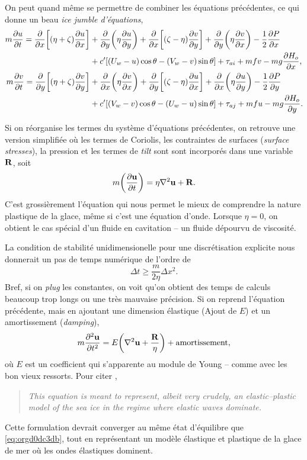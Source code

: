 \documentclass[10pt]{article}
\numberwithin{equation}{section}
\newcommand{\uu}{\vb{u}}
\begin{document}
On peut quand même se permettre de combiner les équations précédentes, ce qui donne un beau \emph{ice jumble d'équations},
\begin{align}
   m \pdv{u}{t} = \pdv{}{x}\qty[(\eta + \zeta)\pdv{u}{x}] &+\pdv{}{y}\qty(\eta\pdv{u}{y}) + \pdv{}{x}\qty[(\zeta-\eta)\pdv{v}{y}] + \pdv{}{y}\qty(\eta \pdv{v}{x}) - \frac{1}{2}\pdv{P}{x}\nonumber\\
     & + c'\qty[\qty(U_w-u)\cos\theta - \qty(V_w-v)\sin\theta] + \tau_{ai} + mfv - mg\pdv{H_o}{x},\\
   m \pdv{v}{t} = \pdv{}{y}\qty[(\eta + \zeta)\pdv{v}{y}] &+\pdv{}{x}\qty(\eta\pdv{v}{x}) + \pdv{}{y}\qty[(\zeta-\eta)\pdv{u}{x}] + \pdv{}{x}\qty(\eta \pdv{u}{y}) - \frac{1}{2}\pdv{P}{y}\nonumber\\
     & + c'\qty[\qty(V_w-v)\cos\theta - \qty(U_w-u)\sin\theta] + \tau_{aj} + mfu - mg\pdv{H_o}{y}.
\end{align}

Si on réorganise les termes du système d'équations précédentes, on retrouve une version simplifiée où les termes de Coriolis, les contraintes de surfaces (\emph{surface stresses}), la pression et les termes de \emph{tilt} sont sont incorporés dans une variable \(\vb{R}\), soit
\begin{equation}
\label{eq:orgd0dc3db}
   m\qty(\pdv{\uu}{t}) = \eta \laplacian{\uu} + \vb{R}.
\end{equation}
C'est grossièrement l'équation qui nous permet le mieux de comprendre la nature plastique de la glace, même si c'est une équation d'onde. 
Lorsque \(\eta=0\), on obtient le cas spécial d'un fluide en cavitation -- un fluide dépourvu de viscosité.\bigskip

La condition de stabilité unidimensionelle pour une discrétisation explicite nous donnerait un pas de temps numérique de l'ordre de
\begin{equation}
   \Delta t \geq \frac{m}{2\eta} \Delta x^2.
\end{equation}
Bref, si on \emph{plug} les constantes, on voit qu'on obtient des temps de calculs beaucoup trop longs ou une très mauvaise précision.
Si on reprend l'équation précédente, mais en ajoutant une dimension élastique (Ajout de \(E\)) et un amortissement (\emph{damping}),
\begin{equation}
\label{eq:orgbf8b0d0}
   m \pdv[2]{\uu}{t} =E \qty(\laplacian{\uu} + \frac{\vb{R}}{\eta}) + \text{amortissement},
\end{equation}
où \(E\) est un coefficient qui s'apparente au module de Young -- comme avec les bon vieux ressorts. 
Pour citer \Textcite{hunke1997elastic},
\begin{quote}
\emph{This equation is meant to represent, albeit very crudely, an elastic–plastic model of the sea ice in the regime where elastic waves dominate.}
\end{quote}
Cette formulation devrait converger au même état d'équilibre que \ref{eq:orgd0dc3db}, tout en représentant un modèle élastique et plastique de la glace de mer où les ondes élastiques dominent.\bigskip
\end{document}
